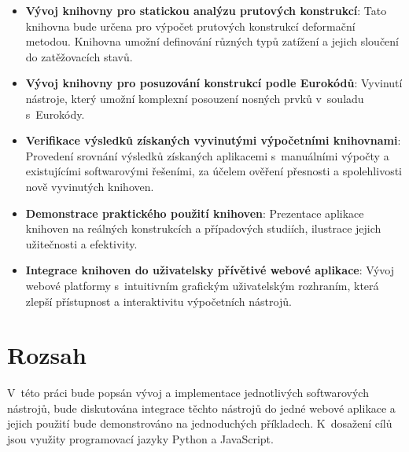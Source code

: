 \begin{itemize}
    \item \textbf{Vývoj knihovny pro statickou analýzu prutových konstrukcí}: Tato knihovna bude určena pro výpočet prutových konstrukcí deformační metodou. Knihovna umožní definování různých typů zatížení a jejich sloučení do zatěžovacích stavů.
\item \textbf{Vývoj knihovny pro posuzování konstrukcí podle Eurokódů}: Vyvinutí nástroje, který umožní komplexní posouzení nosných prvků v~souladu s~Eurokódy.
\item \textbf{Verifikace výsledků získaných vyvinutými výpočetními knihovnami}: Provedení srovnání výsledků získaných aplikacemi s~manuálními výpočty a existujícími softwarovými řešeními, za účelem ověření přesnosti a spolehlivosti nově vyvinutých knihoven.
\item \textbf{Demonstrace praktického použití knihoven}: Prezentace aplikace knihoven na reálných konstrukcích a případových studiích, ilustrace jejich užitečnosti a efektivity.
\item \textbf{Integrace knihoven do uživatelsky přívětivé webové aplikace}: Vývoj webové platformy s~intuitivním grafickým uživatelským rozhraním, která zlepší přístupnost a interaktivitu výpočetních nástrojů.
\end{itemize}


\section*{Rozsah}
V~této práci bude popsán vývoj a implementace jednotlivých softwarových nástrojů, bude diskutována integrace těchto nástrojů do jedné webové aplikace a jejich použití bude demonstrováno na jednoduchých příkladech. K~dosažení cílů jsou využity programovací jazyky Python a JavaScript.

